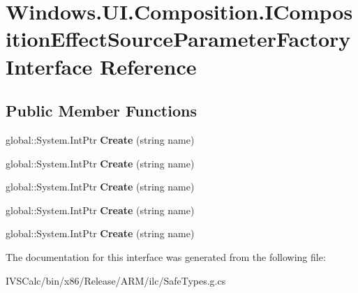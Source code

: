 \hypertarget{interface_windows_1_1_u_i_1_1_composition_1_1_i_composition_effect_source_parameter_factory}{}\section{Windows.\+U\+I.\+Composition.\+I\+Composition\+Effect\+Source\+Parameter\+Factory Interface Reference}
\label{interface_windows_1_1_u_i_1_1_composition_1_1_i_composition_effect_source_parameter_factory}
\subsection*{Public Member Functions}
\begin{DoxyCompactItemize}
\item 
\mbox{\label{interface_windows_1_1_u_i_1_1_composition_1_1_i_composition_effect_source_parameter_factory_a75190f421b6eea0ff7052ff0411307a8}} 
global\+::\+System.\+Int\+Ptr {\bfseries Create} (string name)
\item 
\mbox{\label{interface_windows_1_1_u_i_1_1_composition_1_1_i_composition_effect_source_parameter_factory_a75190f421b6eea0ff7052ff0411307a8}} 
global\+::\+System.\+Int\+Ptr {\bfseries Create} (string name)
\item 
\mbox{\label{interface_windows_1_1_u_i_1_1_composition_1_1_i_composition_effect_source_parameter_factory_a75190f421b6eea0ff7052ff0411307a8}} 
global\+::\+System.\+Int\+Ptr {\bfseries Create} (string name)
\item 
\mbox{\label{interface_windows_1_1_u_i_1_1_composition_1_1_i_composition_effect_source_parameter_factory_a75190f421b6eea0ff7052ff0411307a8}} 
global\+::\+System.\+Int\+Ptr {\bfseries Create} (string name)
\item 
\mbox{\label{interface_windows_1_1_u_i_1_1_composition_1_1_i_composition_effect_source_parameter_factory_a75190f421b6eea0ff7052ff0411307a8}} 
global\+::\+System.\+Int\+Ptr {\bfseries Create} (string name)
\end{DoxyCompactItemize}


The documentation for this interface was generated from the following file\+:\begin{DoxyCompactItemize}
\item 
I\+V\+S\+Calc/bin/x86/\+Release/\+A\+R\+M/ilc/Safe\+Types.\+g.\+cs\end{DoxyCompactItemize}
